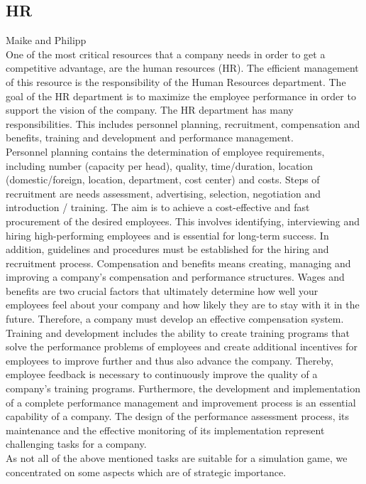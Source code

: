 \subsection{HR}
Maike and Philipp \\
One of the most critical resources that a company needs in order to get a competitive advantage, are the human resources (HR). The efficient management of this resource is the responsibility of the Human Resources department. The goal of the HR department is to maximize the employee performance in order to support the vision of the company. The HR department has many responsibilities. This includes personnel planning, recruitment, compensation and benefits, training and development and performance management.\\
Personnel planning contains the determination of employee requirements, including number (capacity per head), quality, time/duration, location (domestic/foreign, location, department, cost center) and costs. Steps of recruitment are needs assessment, advertising, selection, negotiation and introduction / training. The aim is to achieve a cost-effective and fast procurement of the desired employees. This involves identifying, interviewing and hiring high-performing employees and is essential for long-term success. In addition, guidelines and procedures must be established for the hiring and recruitment process. Compensation and benefits means creating, managing and improving a company's compensation and performance structures. Wages and benefits are two crucial factors that ultimately determine how well your employees feel about your company and how likely they are to stay with it in the future. Therefore, a company must develop an effective compensation system. Training and development includes the ability to create training programs that solve the performance problems of employees and create additional incentives for employees to improve further and thus also advance the company. Thereby, employee feedback is necessary to continuously improve the quality of a company's training programs. Furthermore, the development and implementation of a complete performance management and improvement process is an essential capability of a company. The design of the performance assessment process, its maintenance and the effective monitoring of its implementation represent challenging tasks for a company. \\
As not all of the above mentioned tasks are suitable for a simulation game, we concentrated on some aspects which are of strategic importance.
